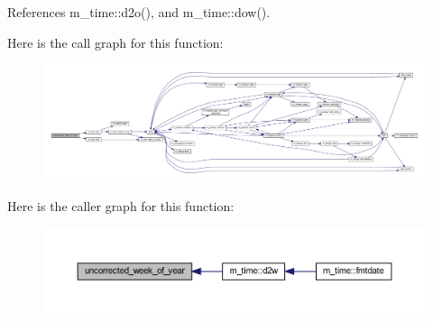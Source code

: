 References m\+\_\+time\+::d2o(), and m\+\_\+time\+::dow().

Here is the call graph for this function\+:
\nopagebreak
\begin{figure}[H]
\begin{center}
\leavevmode
\includegraphics[width=350pt]{M__time_8f90_a4a68c5e906616f64da0c3d165fc41479_cgraph}
\end{center}
\end{figure}
Here is the caller graph for this function\+:
\nopagebreak
\begin{figure}[H]
\begin{center}
\leavevmode
\includegraphics[width=350pt]{M__time_8f90_a4a68c5e906616f64da0c3d165fc41479_icgraph}
\end{center}
\end{figure}
